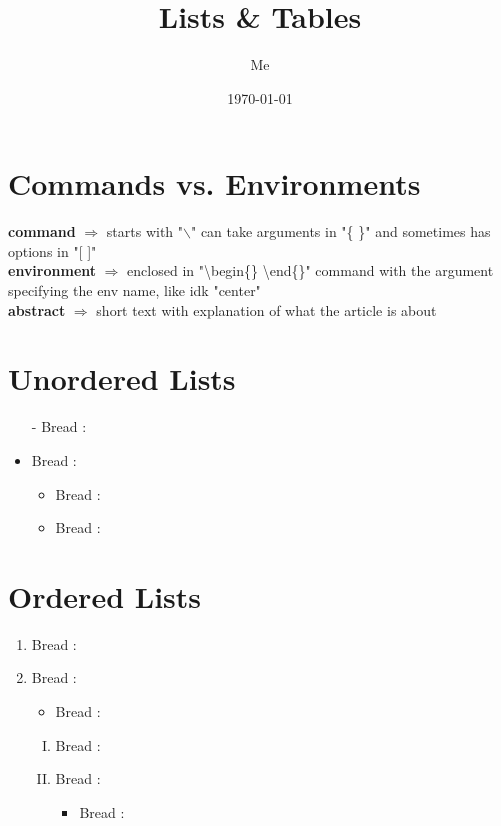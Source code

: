\documentclass[12pt, titlepage]{article}
\title{Lists \& Tables}
\author{Me}
\date{\today}
\begin{document}
\maketitle

\newpage
\tableofcontents
\newpage

\section{Commands vs. Environments}

\textbf{command} $\Rightarrow$ starts with "$\backslash$" can take arguments in "\{ \}" and sometimes has options in "[ ]"
\\
\textbf{environment} $\Rightarrow$ enclosed in "\textbackslash begin\{\} \textbackslash end\{\}" command with the argument specifying the env name, like idk "center"
\\
\textbf{abstract} $\Rightarrow$ short text with explanation of what the article is about

\section{Unordered Lists}
\begin{itemize}
    \item[-] Bread :\textbar
    \item Bread :\textbar
    \begin{itemize}
        \item Bread :\textbar
        \item Bread :\textbar
    \end{itemize}
\end{itemize}

\section{Ordered Lists}
\begin{enumerate}
    \item Bread :\textbar
    \item Bread :\textbar
    \begin{itemize}
        \item Bread :\textbar
    \end{itemize}
    \begin{enumerate}[I)]
        \item Bread :\textbar
        \item Bread :\textbar
        \begin{itemize}
            \item Bread :\textbar
        \end{itemize}
    \end{enumerate}
\end{enumerate}
\end{document}

